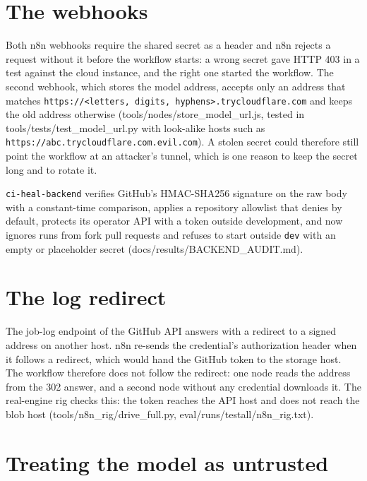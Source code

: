 \documentclass[11pt,a4paper]{report}
\begin{document}
\section{The webhooks}

Both n8n webhooks require the shared secret as a header and n8n rejects a request without it before the workflow starts: a wrong secret gave HTTP 403 in a test against the cloud instance, and the right one started the workflow. The second webhook, which stores the model address, accepts only an address that matches \texttt{https:/\allowbreak{}/\allowbreak{}\textless{}letters, digits, hyphens\textgreater{}.\allowbreak{}trycloudflare.\allowbreak{}com} and keeps the old address otherwise (tools/nodes/store\_model\_url.js, tested in tools/tests/test\_model\_url.py with look-alike hosts such as \texttt{https:/\allowbreak{}/\allowbreak{}abc.\allowbreak{}trycloudflare.\allowbreak{}com.\allowbreak{}evil.\allowbreak{}com}). A stolen secret could therefore still point the workflow at an attacker's tunnel, which is one reason to keep the secret long and to rotate it.

\texttt{ci-\allowbreak{}heal-\allowbreak{}backend} verifies GitHub's HMAC-SHA256 signature on the raw body with a constant-time comparison, applies a repository allowlist that denies by default, protects its operator API with a token outside development, and now ignores runs from fork pull requests and refuses to start outside \texttt{dev} with an empty or placeholder secret (docs/results/BACKEND\_AUDIT.md).

\section{The log redirect}

The job-log endpoint of the GitHub API answers with a redirect to a signed address on another host. n8n re-sends the credential's authorization header when it follows a redirect, which would hand the GitHub token to the storage host. The workflow therefore does not follow the redirect: one node reads the address from the 302 answer, and a second node without any credential downloads it. The real-engine rig checks this: the token reaches the API host and does not reach the blob host (tools/n8n\_rig/drive\_full.py, eval/runs/testall/n8n\_rig.txt).

\section{Treating the model as untrusted}
\end{document}
